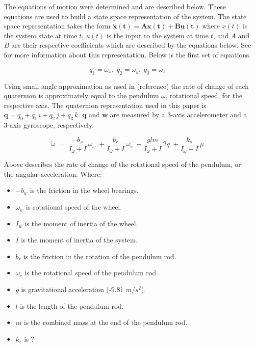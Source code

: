 \documentclass{article}
\begin{document}
The equations of motion were determined and are described below.
These equations are used to build a state space representation
of the system. The state space representation takes the form 
$\boldsymbol{\dot{x}(t)} = \boldsymbol{A}\boldsymbol{x(t)} + 
\boldsymbol{B}\boldsymbol{u(t)}$ where $x(t)$ is the system state 
at time $t$, $u(t)$ is the input to the system at time $t$, and $A$ 
and $B$ are their respective coefficients which are described by 
the equations below. See \cite{mitstatespace} for more information 
about this representation. Below is the first set of equations.

$$\dot{q}_1 = \omega_x,\;  
\dot{q}_2 = \omega_y,\;
\dot{q}_3 = \omega_z$$

Using small angle approximation as used in (reference) the rate of 
change of each quaternion is approximately equal to the pendulum 
$\omega$, rotational speed, for the respective axis. The quaternion
representation used in this paper is $\boldsymbol{q} = q_0 + q_1\,i 
+ q_2\,j + q_3\,k$. $\boldsymbol{q}$ and $\boldsymbol{w}$ are measured 
by a 3-axis accelerometer and a 3-axis gyroscope, respectively.

$$\dot{\omega}\; =\;
\frac{-b_\omega}{I_\omega + I}\,\omega_\omega\;
+ \frac{b_r}{I_\omega + I}\,\omega_r\;
+ \frac{glm}{I_\omega + I}\,2q\;
+ \frac{k_s}{I_\omega + I}\,\mu$$

Above describes the rate of change of the rotational speed of the 
pendulum, or the angular acceleration. Where:
\begin{itemize}
\setlength{\itemindent}{.5in}
\item $-b_w$ is the friction in the wheel bearings.
\item $\omega_w$ is rotational speed of the wheel.
\item $I_w$ is the moment of inertia of the wheel.
\item $I$ is the moment of inertia of the system.
\item $b_r$ is the friction in the rotation of the pendulum rod.
\item $\omega_r$ is the rotational speed of the pendulum rod.
\item $g$ is gravitational acceleration (-9.81 $m/s^2$).
\item $l$ is the length of the pendulum rod.
\item $m$ is the combined mass at the end of the pendulum rod.
\item $k_s$ is ?
\end{itemize}
\end{document}
